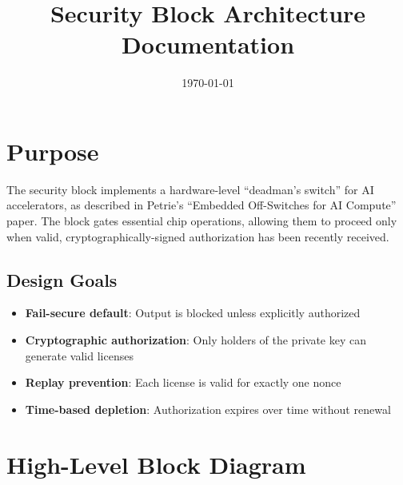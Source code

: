 \documentclass[11pt]{article}
\title{Security Block Architecture Documentation}
\author{}
\date{\today}
\begin{document}
\maketitle
\tableofcontents
\newpage

\section{Purpose}

The security block implements a hardware-level ``deadman's switch'' for AI accelerators, as described in Petrie's ``Embedded Off-Switches for AI Compute'' paper. The block gates essential chip operations, allowing them to proceed only when valid, cryptographically-signed authorization has been recently received.

\subsection{Design Goals}

\begin{itemize}
    \item \textbf{Fail-secure default}: Output is blocked unless explicitly authorized
    \item \textbf{Cryptographic authorization}: Only holders of the private key can generate valid licenses
    \item \textbf{Replay prevention}: Each license is valid for exactly one nonce
    \item \textbf{Time-based depletion}: Authorization expires over time without renewal
\end{itemize}

\section{High-Level Block Diagram}
\end{document}
